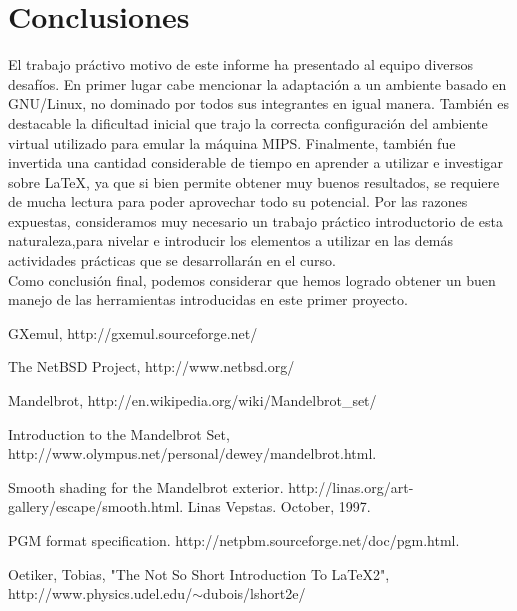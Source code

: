 \documentclass[a4paper,10pt]{article}
\begin{document}
\section{Conclusiones}
El trabajo pr\'activo motivo de este informe ha presentado al equipo diversos desaf\'ios. En primer lugar cabe mencionar la adaptaci\'on a un ambiente basado en GNU/Linux, no dominado por todos sus integrantes en igual manera. Tambi\'en es destacable la dificultad inicial que trajo la correcta configuraci\'on del ambiente virtual utilizado para emular la m\'aquina MIPS. Finalmente, tambi\'en fue invertida una cantidad considerable de tiempo en aprender a utilizar e investigar sobre \LaTeX{}, ya que si bien permite obtener muy buenos resultados, se requiere de mucha lectura para poder aprovechar todo su potencial.
Por las razones expuestas, consideramos muy necesario un trabajo pr\'actico introductorio de esta naturaleza,para nivelar e introducir los elementos a utilizar en las dem\'as actividades pr\'acticas que se desarrollar\'an en el curso.\\
Como conclusi\'on final, podemos considerar que hemos logrado obtener un buen manejo de las herramientas introducidas en este primer proyecto.

\pagebreak

\begin{thebibliography}{99}
	
 GXemul, http://gxemul.sourceforge.net/

 The NetBSD Project, http://www.netbsd.org/

 Mandelbrot, http://en.wikipedia.org/wiki/Mandelbrot\_set/

  Introduction to the Mandelbrot Set,
http://www.olympus.net/personal/dewey/mandelbrot.html.

 Smooth shading for the Mandelbrot exterior.
http://linas.org/art-gallery/escape/smooth.html. Linas Vepstas. October, 1997.

 PGM format specification.
http://netpbm.sourceforge.net/doc/pgm.html.

 Oetiker, Tobias, "The Not So Short Introduction To LaTeX2", http://www.physics.udel.edu/$\sim$dubois/lshort2e/



\end{thebibliography}
\end{document}
